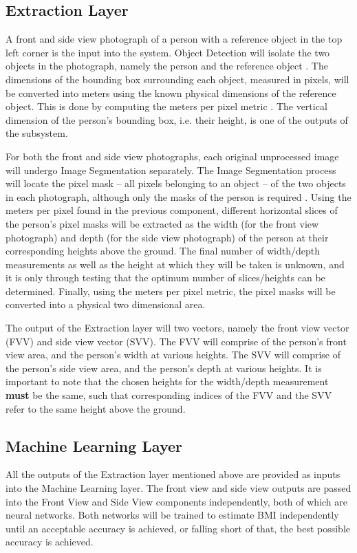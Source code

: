 \documentclass[conference]{IEEEtran}
\begin{document}
\subsection{Extraction Layer}
A front and side view photograph of a person with a reference object in the top left corner is the input into the system.
Object Detection will isolate the two objects in the photograph, namely the person and the reference object \cite{objectDetection}.
The dimensions of the bounding box surrounding each object, measured in pixels, will be converted into meters using the known physical dimensions of the reference object.
This is done by computing the meters per pixel metric \cite{objectDetection}.
The vertical dimension of the person's bounding box, i.e. their height, is one of the outputs of the subsystem.

For both the front and side view photographs, each original unprocessed image will undergo Image Segmentation separately.
The Image Segmentation process will locate the pixel mask -- all pixels belonging to an object -- of the two objects in each photograph, although only the masks of the person is required \cite{semantic,instance}.
Using the meters per pixel found in the previous component, different horizontal slices of the person's pixel masks will be extracted as the width (for the front view photograph) and depth (for the side view photograph) of the person at their corresponding heights above the ground.
The final number of width/depth measurements as well as the height at which they will be taken is unknown, and it is only through testing that the optimum number of slices/heights can be determined.
Finally, using the meters per pixel metric, the pixel masks will be converted into a physical two dimensional area.

The output of the Extraction layer will two vectors, namely the front view vector (FVV) and side view vector (SVV).
The FVV will comprise of the person's front view area, and the person's width at various heights.
The SVV will comprise of the person's side view area, and the person's depth at various heights.
It is important to note that the chosen heights for the width/depth measurement \textbf{must} be the same, such that corresponding indices of the FVV and the SVV refer to the same height above the ground.
\subsection{Machine Learning Layer}
All the outputs of the Extraction layer mentioned above are provided as inputs into the Machine Learning layer.
The front view and side view outputs are passed into the Front View and Side View components independently, both of which are neural networks.
Both networks will be trained to estimate BMI independently until an acceptable accuracy is achieved, or falling short of that, the best possible accuracy is achieved.
\end{document}
